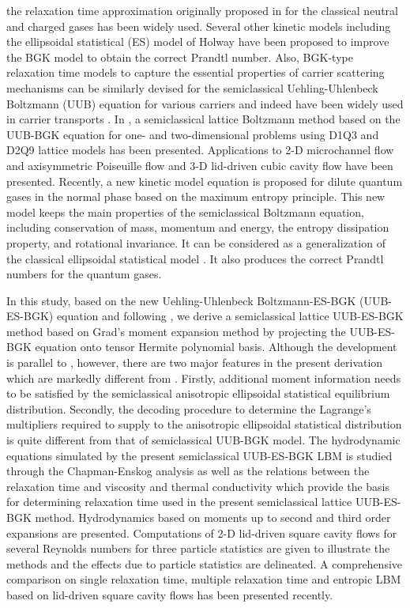 \documentclass[doublecol]{epl2}
\begin{document}
the relaxation time approximation originally proposed in \cite{BGK1954} for the classical neutral and charged gases has been widely used.  Several other kinetic models including the ellipsoidal statistical (ES) model of Holway \cite{Holway1966} have been proposed to improve the BGK model to obtain the correct Prandtl number.  Also, BGK-type relaxation time models to capture the essential properties of carrier scattering mechanisms can be similarly devised for the semiclassical Uehling-Uhlenbeck Boltzmann (UUB) equation for various carriers and indeed have been widely used in carrier transports \cite{Lund2000, Chen2005}. In \cite{Yang2009}, a semiclassical lattice Boltzmann method based on the UUB-BGK equation for one- and two-dimensional problems using D1Q3 and D2Q9 lattice models has been presented.  Applications to 2-D microchannel flow and axisymmetric Poiseuille flow and 3-D lid-driven cubic cavity flow have been presented.  Recently, a new kinetic model equation is proposed \cite{Wu2012} for dilute quantum gases in the normal phase based on the maximum entropy principle. This new model keeps the main properties of the semiclassical Boltzmann equation, including conservation of mass, momentum and energy, the entropy dissipation property, and rotational invariance. It can be considered as a generalization of the classical ellipsoidal statistical model \cite{Holway1966}. It also produces the correct Prandtl numbers for the quantum gases.

In this study, based on the new Uehling-Uhlenbeck Boltzmann-ES-BGK (UUB-ES-BGK) equation \cite{Wu2012} and following \cite{Yang2009}, we
derive a semiclassical lattice UUB-ES-BGK method based on Grad's moment expansion method by projecting the UUB-ES-BGK equation onto tensor Hermite polynomial basis.  Although the development is parallel to \cite{Yang2009}, however, there are two major features in the present derivation which are markedly different from \cite{Yang2009}. Firstly, additional moment information needs to be satisfied by the semiclassical anisotropic ellipsoidal statistical equilibrium distribution. Secondly, the decoding procedure to determine the Lagrange's multipliers required to supply to the anisotropic ellipsoidal statistical distribution is quite different from that of semiclassical UUB-BGK model.  The hydrodynamic equations simulated by the present semiclassical UUB-ES-BGK LBM is studied through the Chapman-Enskog analysis as well as the relations between the relaxation time and viscosity and thermal conductivity which provide the basis for determining relaxation time used in the present semiclassical lattice UUB-ES-BGK method.  Hydrodynamics based on moments up to second and third order expansions are presented. Computations of 2-D lid-driven square cavity flows for several Reynolds numbers for three particle statistics are given to illustrate the methods and the effects due to particle statistics are delineated.  A comprehensive comparison on single relaxation time, multiple relaxation time and entropic LBM based on lid-driven square cavity flows has been presented recently. %
\end{document}
